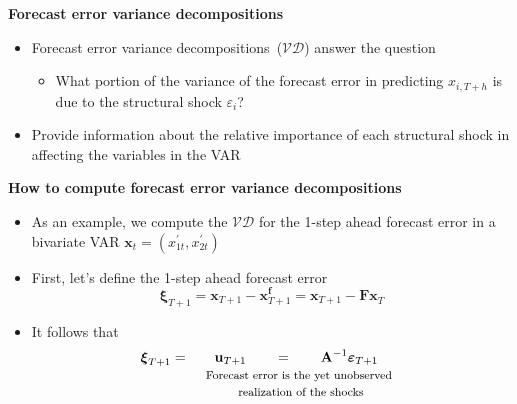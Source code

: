 \documentclass[10pt,handout]{beamer}
\begin{document}
\vspace{0.1cm}

\begin{frame}
{\textbf{Forecast error variance decompositions}}

\begin{itemize}
\item Forecast error variance decompositions\ ($\mathcal{VD}$) answer the
question

\begin{itemize}
\item What portion of the {{variance of the forecast error in predicting $%
x_{i,T+h}$ is due to the structural shock $\varepsilon _{i}$}}? \medskip %
\pause
\end{itemize}

\item Provide information about the relative importance of each structural
shock in affecting the variables in the VAR
\end{itemize}
\end{frame}

\vspace{0.1cm}

\begin{frame}
{\textbf{How to compute {forecast error variance decompositions}}}

\begin{itemize}
\item As an example, we compute the $\mathcal{VD}$ for the 1-step ahead
forecast error in a bivariate VAR $\mathbf{x}_{t}=\left( x_{1t}^{\prime
},x_{2t}^{\prime }\right) $\medskip \pause

\item First, let's define the 1-step ahead forecast error%
\begin{equation*}
\mathbf{\xi }_{T+1}=\mathbf{x}_{T+1}-\mathbf{x}_{T+1}^{\mathbf{f}}=\mathbf{x}%
_{T+1}-\mathbf{Fx}_{T}
\end{equation*}

\item It follows that%
\begin{equation*}
\mathbf{\xi }_{T+1}=\underset{%
\begin{array}{c}
\text{{\footnotesize Forecast error is the yet unobserved }} \\ 
\text{{\footnotesize realization of the shocks}}%
\end{array}%
}{\mathbf{u}_{T+1}\ \ \ \ \ \ =\ \ \ \ \ \ \mathbf{A}^{-1}\mathbf{%
\varepsilon }_{T+1}}
\end{equation*}
\end{itemize}
\end{frame}
\end{document}
